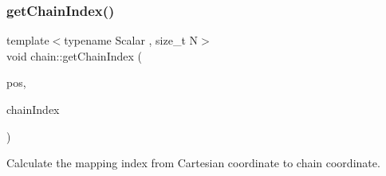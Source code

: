 \subsubsection{\texorpdfstring{get\+Chain\+Index()}{getChainIndex()}}
{\footnotesize\ttfamily template$<$typename Scalar , size\+\_\+t N$>$ \\
void chain\+::get\+Chain\+Index (\begin{DoxyParamCaption}\item[{const \mbox{\hyperlink{namespacechain_aa715d2f046187ea9f0c3ea55605d6214}{Vector\+Array}}$<$ Scalar, N $>$ \&}]{pos,  }\item[{\mbox{\hyperlink{namespacechain_aa40d2da395c0ac2bc5f37832442ac403}{Index\+Array}}$<$ N $>$ \&}]{chain\+Index }\end{DoxyParamCaption})}



Calculate the mapping index from Cartesian coordinate to chain coordinate. 

